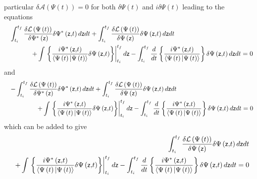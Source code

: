 \documentclass[aps,preprint]{revtex4}
\begin{document}
particular $\delta \mathcal{A}\left( \Psi \left( t\right) \right) =0$ for
both $\delta \Psi \left( t\right) $ and $i\delta \Psi \left( t\right) $
leading to the equations 
\begin{eqnarray}
&&\int_{t_{i}}^{t_{f}}\frac{\delta \mathcal{L}\left( \Psi \left( t\right)
\right) }{\delta \Psi ^{\ast }\left( \mathsf{z}\right) }\delta \Psi ^{\ast
}\left( \mathsf{z,}t\right) d\mathsf{z}dt+\int_{t_{i}}^{t_{f}}\frac{\delta 
\mathcal{L}\left( \Psi \left( t\right) \right) }{\delta \Psi \left( \mathsf{z%
}\right) }\delta \Psi \left( \mathsf{z,}t\right) d\mathsf{z}dt\qquad \qquad
\qquad \qquad \qquad \qquad  \notag \\
&&+\int \left. \left\{ \frac{i\Psi ^{\ast }\left( \mathsf{z,}t\right) }{%
\left\langle \Psi \left( t\right) |\Psi \left( t\right) \right\rangle }%
\delta \Psi \left( \mathsf{z,}t\right) \right\} \right| _{t_{i}}^{t_{f}}d%
\mathsf{z}-\int_{t_{i}}^{t_{f}}\frac{d}{dt}\left\{ \frac{i\Psi ^{\ast
}\left( \mathsf{z,}t\right) }{\left\langle \Psi \left( t\right) |\Psi \left(
t\right) \right\rangle }\right\} \delta \Psi \left( \mathsf{z,}t\right) d%
\mathsf{z}dt=0
\end{eqnarray}%
and 
\begin{eqnarray}
&&-\int_{t_{i}}^{t_{f}}\frac{\delta \mathcal{L}\left( \Psi \left( t\right)
\right) }{\delta \Psi ^{\ast }\left( \mathsf{z}\right) }\delta \Psi ^{\ast
}\left( \mathsf{z,}t\right) d\mathsf{z}dt+\int_{t_{i}}^{t_{f}}\frac{\delta 
\mathcal{L}\left( \Psi \left( t\right) \right) }{\delta \Psi \left( \mathsf{z%
}\right) }\delta \Psi \left( \mathsf{z,}t\right) d\mathsf{z}dt\qquad \qquad
\qquad \qquad \qquad \qquad  \notag \\
&&+\int \left. \left\{ \frac{i\Psi ^{\ast }\left( \mathsf{z,}t\right) }{%
\left\langle \Psi \left( t\right) |\Psi \left( t\right) \right\rangle }%
\delta \Psi \left( \mathsf{z,}t\right) \right\} \right| _{t_{i}}^{t_{f}}d%
\mathsf{z}-\int_{t_{i}}^{t_{f}}\frac{d}{dt}\left\{ \frac{i\Psi ^{\ast
}\left( \mathsf{z,}t\right) }{\left\langle \Psi \left( t\right) |\Psi \left(
t\right) \right\rangle }\right\} \delta \Psi \left( \mathsf{z,}t\right) d%
\mathsf{z}dt=0
\end{eqnarray}%
which can be added to give 
\begin{eqnarray}
&&\int_{t_{i}}^{t_{f}}\frac{\delta \mathcal{L}\left( \Psi \left( t\right)
\right) }{\delta \Psi \left( \mathsf{z}\right) }\delta \Psi \left( \mathsf{z,%
}t\right) d\mathsf{z}dt  \notag \\
&&+\int \left. \left\{ \frac{i\Psi ^{\ast }\left( \mathsf{z,}t\right) }{%
\left\langle \Psi \left( t\right) |\Psi \left( t\right) \right\rangle }%
\delta \Psi \left( \mathsf{z,}t\right) \right\} \right| _{t_{i}}^{t_{f}}d%
\mathsf{z}-\int_{t_{i}}^{t_{f}}\frac{d}{dt}\left\{ \frac{i\Psi ^{\ast
}\left( \mathsf{z,}t\right) }{\left\langle \Psi \left( t\right) |\Psi \left(
t\right) \right\rangle }\right\} \delta \Psi \left( \mathsf{z,}t\right) d%
\mathsf{z}dt=0  \label{e1}
\end{eqnarray}%
\end{document}
